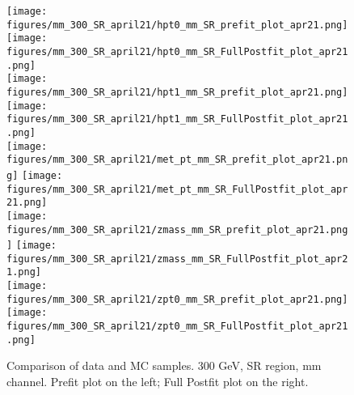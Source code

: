 \begin{figure}[H]
\begin{center}
\texttt{[image: figures/mm\_300\_SR\_april21/hpt0\_mm\_SR\_prefit\_plot\_apr21.png]}
\texttt{[image: figures/mm\_300\_SR\_april21/hpt0\_mm\_SR\_FullPostfit\_plot\_apr21.png]}\\
\texttt{[image: figures/mm\_300\_SR\_april21/hpt1\_mm\_SR\_prefit\_plot\_apr21.png]}
\texttt{[image: figures/mm\_300\_SR\_april21/hpt1\_mm\_SR\_FullPostfit\_plot\_apr21.png]}\\
\texttt{[image: figures/mm\_300\_SR\_april21/met\_pt\_mm\_SR\_prefit\_plot\_apr21.png]}
\texttt{[image: figures/mm\_300\_SR\_april21/met\_pt\_mm\_SR\_FullPostfit\_plot\_apr21.png]}\\
\texttt{[image: figures/mm\_300\_SR\_april21/zmass\_mm\_SR\_prefit\_plot\_apr21.png]}
\texttt{[image: figures/mm\_300\_SR\_april21/zmass\_mm\_SR\_FullPostfit\_plot\_apr21.png]}\\
\texttt{[image: figures/mm\_300\_SR\_april21/zpt0\_mm\_SR\_prefit\_plot\_apr21.png]}
\texttt{[image: figures/mm\_300\_SR\_april21/zpt0\_mm\_SR\_FullPostfit\_plot\_apr21.png]}\\
\caption[Data-MC comparison in SR, other variables.]{Comparison of data and MC samples. 300 GeV, SR region, mm channel. Prefit plot on the left; Full Postfit plot on the right.}
\label{MCcomparisons_mm_low_SR_2}
\end{center}
\end{figure}

